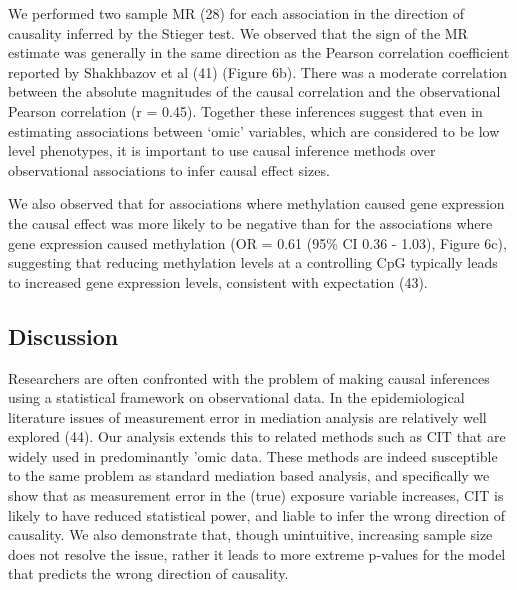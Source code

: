 \documentclass[]{article}
\begin{document}
We performed two sample MR (28) for each association in the direction of
causality inferred by the Stieger test. We observed that the sign of the
MR estimate was generally in the same direction as the Pearson
correlation coefficient reported by Shakhbazov et al (41) (Figure 6b).
There was a moderate correlation between the absolute magnitudes of the
causal correlation and the observational Pearson correlation (r = 0.45).
Together these inferences suggest that even in estimating associations
between `omic' variables, which are considered to be low level
phenotypes, it is important to use causal inference methods over
observational associations to infer causal effect sizes.

We also observed that for associations where methylation caused gene
expression the causal effect was more likely to be negative than for the
associations where gene expression caused methylation (OR = 0.61 (95\%
CI 0.36 - 1.03), Figure 6c), suggesting that reducing methylation levels
at a controlling CpG typically leads to increased gene expression
levels, consistent with expectation (43).

\subsection{Discussion}\label{discussion}

Researchers are often confronted with the problem of making causal
inferences using a statistical framework on observational data. In the
epidemiological literature issues of measurement error in mediation
analysis are relatively well explored (44). Our analysis extends this to
related methods such as CIT that are widely used in predominantly 'omic
data. These methods are indeed susceptible to the same problem as
standard mediation based analysis, and specifically we show that as
measurement error in the (true) exposure variable increases, CIT is
likely to have reduced statistical power, and liable to infer the wrong
direction of causality. We also demonstrate that, though unintuitive,
increasing sample size does not resolve the issue, rather it leads to
more extreme p-values for the model that predicts the wrong direction of
causality.
\end{document}
